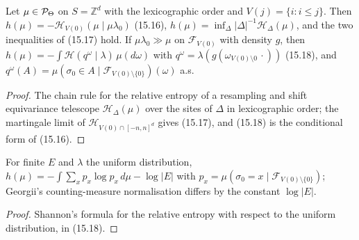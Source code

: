 \begin{theorem}[Georgii (15.16)--(15.18)]
    \label{thm:sent-15-16}
    \leanok

    Let $\mu \in \mathcal{P}_\Theta$ on $S = \mathbb Z^d$ with the lexicographic order and
    $V(j) = \{i : i \leq j\}$. Then $h(\mu) = -\mathcal H_{V(0)}(\mu \mid \mu\lambda_0)$
    (15.16), $h(\mu) = \inf_\Delta |\Delta|^{-1}\mathcal H_\Delta(\mu)$, and the two
    inequalities of (15.17) hold. If $\mu\lambda_0 \gg \mu$ on $\mathcal F_{V(0)}$ with density
    $g$, then $h(\mu) = -\int \mathcal H(q^\omega \mid \lambda)\,\mu(d\omega)$ with
    $q^\omega = \lambda(g(\omega_{V(0)\setminus 0}\,\cdot))$ (15.18), and
    $q^\omega(A) = \mu(\sigma_0 \in A \mid \mathcal F_{V(0)\setminus\{0\}})(\omega)$ a.s.
\end{theorem}
\begin{proof}
    \leanok
    The chain rule for the relative entropy of a resampling and shift equivariance telescope
    $\mathcal H_\Delta(\mu)$ over the sites of $\Delta$ in lexicographic order; the martingale
    limit of $\mathcal H_{V(0) \cap [-n,n]^d}$ gives (15.17), and (15.18) is the conditional
    form of (15.16).
\end{proof}

\begin{proposition}[Georgii (15.19)]
    \label{prop:sent-15-19}
    \leanok

    For finite $E$ and $\lambda$ the uniform distribution,
    $h(\mu) = -\int \sum_{x} p_x \log p_x\,d\mu - \log|E|$ with
    $p_x = \mu(\sigma_0 = x \mid \mathcal F_{V(0)\setminus\{0\}})$; Georgii's counting-measure
    normalisation differs by the constant $\log|E|$.
\end{proposition}
\begin{proof}
    \leanok
    Shannon's formula for the relative entropy with respect to the uniform distribution, in (15.18).
\end{proof}

